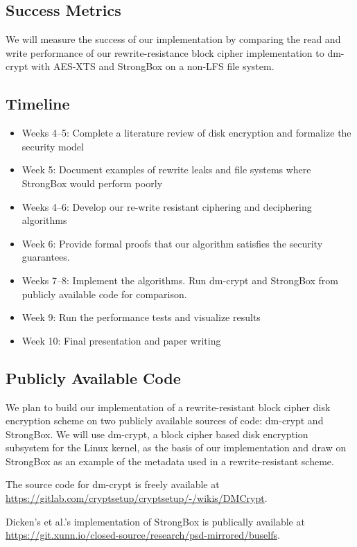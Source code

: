 \documentclass[11pt,twocolumn]{article}
\begin{document}
\subsection*{Success Metrics}
We will measure the success of our implementation by comparing the read and write performance of our rewrite-resistance block cipher implementation to dm-crypt with AES-XTS and StrongBox on a non-LFS file system.

\subsection*{Timeline}

\begin{itemize}
    \item Weeks 4--5: Complete a literature review of disk encryption and formalize the security model
    \item Week 5: Document examples of rewrite leaks and file systems where StrongBox would perform poorly
    \item Weeks 4--6: Develop our re-write resistant ciphering and deciphering algorithms
    \item Week 6: Provide formal proofs that our algorithm satisfies the security guarantees.
    \item Weeks 7--8: Implement the algorithms. Run dm-crypt and StrongBox from publicly available code for comparison.
    \item Week 9: Run the performance tests and visualize results
    \item Week 10: Final presentation and paper writing
\end{itemize}

\subsection*{Publicly Available Code}
We plan to build our implementation of a rewrite-resistant block cipher disk encryption scheme on two publicly available sources of code: dm-crypt and StrongBox. We will use dm-crypt, a block cipher based disk encryption subsystem for the Linux kernel, as the basis of our implementation and draw on StrongBox as an example of the metadata used in a rewrite-resistant scheme.
	
The source code for dm-crypt is freely available at \url{https://gitlab.com/cryptsetup/cryptsetup/-/wikis/DMCrypt}.
	
Dicken's et al.'s implementation of StrongBox is publically available at \url{https://git.xunn.io/closed-source/research/psd-mirrored/buselfs}.



\end{document}
